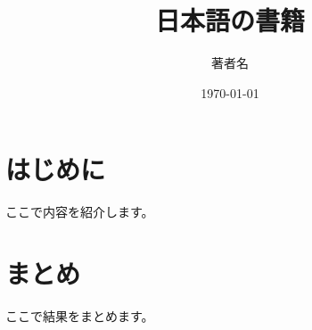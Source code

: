 \documentclass[11pt]{book}
\title{日本語の書籍}
\author{著者名}
\date{\today}
\begin{document}
\maketitle
\tableofcontents

\chapter{はじめに}
ここで内容を紹介します。

\chapter{まとめ}
ここで結果をまとめます。
\end{document}
